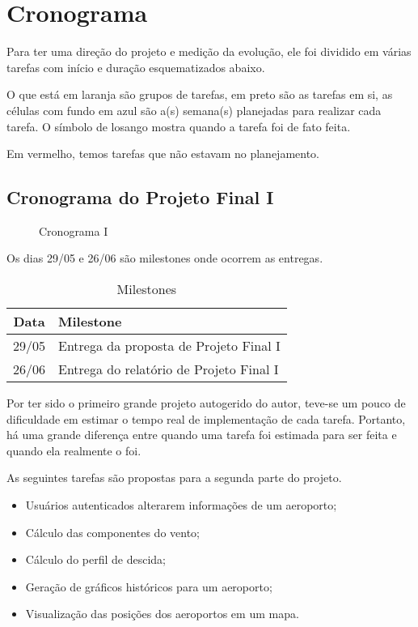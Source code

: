 \chapter{Cronograma}

Para ter uma direção do projeto e medição da evolução, ele foi dividido em várias 
tarefas com início e duração esquematizados abaixo.

O que está em laranja são grupos de tarefas, em preto são as tarefas em si, as 
células com fundo em azul são a(s) semana(s) planejadas para realizar cada tarefa. 
O símbolo de losango mostra quando a tarefa foi de fato feita.

Em vermelho, temos tarefas que não estavam no planejamento.

\section{Cronograma do Projeto Final I}

\begin{figure}[ht]
    \begin{center}
    
    \caption{Cronograma I}
    \label{fig:cronograma-planejado-I}
    \end{center}
\end{figure}

Os dias 29/05 e 26/06 são milestones onde ocorrem as entregas.

\begin{table}[h]
    \centering
    \caption{Milestones}
    \begin{tabular}{|c|l|}
        \hline
        \textbf{Data} & \textbf{Milestone} \\
        \hline
        29/05 & Entrega da proposta de Projeto Final I \\
        26/06 & Entrega do relatório de Projeto Final I \\
        \hline
    \end{tabular}
\end{table}

Por ter sido o primeiro grande projeto autogerido do autor, teve-se um pouco de dificuldade 
em estimar o tempo real de implementação de cada tarefa. Portanto, há uma grande 
diferença entre quando uma tarefa foi estimada para ser feita e quando ela realmente 
o foi.

As seguintes tarefas são propostas para a segunda parte do projeto.

\begin{itemize}
    \item Usuários autenticados alterarem informações de um aeroporto;
    \item Cálculo das componentes do vento;
    \item Cálculo do perfil de descida;
    \item Geração de gráficos históricos para um aeroporto;
    \item Visualização das posições dos aeroportos em um mapa.
\end{itemize}

